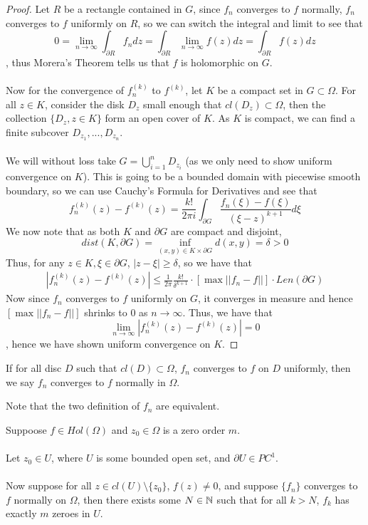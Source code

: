 \documentclass{article}
\begin{document}
\begin{proof}
Let $R$ be a rectangle contained in $G$, since $f_n$ converges to $f$ normally, $f_n$ converges to $f$ uniformly on $R$, so we can switch the integral and limit to see that
\[0 = \lim_{n \to \infty} \int_{\partial R} f_n dz = \int_{\partial R} \lim_{n \to \infty} f(z) dz = \int_{\partial R} f(z) dz\]
, thus Morera's Theorem tells us that $f$ is holomorphic on $G$.\\\\
Now for the convergence of $f_n^{(k)}$ to $f^{(k)}$, let $K$ be a compact set in $G \subset \Omega$. For all $z \in K$, consider the disk $D_z$ small enough that $cl(D_z) \subset \Omega$, then the collection $\{D_z, z\in K\}$ form an open cover of $K$. As $K$ is compact, we can find a finite subcover $D_{z_1}, ..., D_{z_n}$.\\\\
We will without loss take $G = \bigcup_{i = 1}^n D_{z_i}$ (as we only need to show uniform convergence on $K$). This is going to be a bounded domain with piecewise smooth boundary, so we can use Cauchy's Formula for Derivatives and see that
\[f^{(k)}_n(z) - f^{(k)}(z) = \frac{k!}{2\pi i} \int_{\partial G} \frac{f_n(\xi) - f(\xi)}{(\xi - z)^{k+1}} d\xi\]
We now note that as both $K$ and $\partial G$ are compact and disjoint,
\[dist(K, \partial G) = \inf_{(x, y) \in K \times \partial G} d(x, y) = \delta > 0\]
Thus, for any $z \in K, \xi \in \partial G$, $|z - \xi| \geq \delta$, so we have that
\begin{align*}
    |f^{(k)}_n(z) - f^{(k)}(z)| \leq \frac{1}{2\pi} \frac{k!}{\delta^{k+1}} \cdot [\max ||f_n  - f||] \cdot Len(\partial G)
\end{align*}
Now since $f_n$ converges to $f$ uniformly on $G$, it converges in measure and hence $[\max ||f_n  - f||]$ shrinks to $0$ as $n \to \infty$. Thus, we have that
\[\lim_{n \to \infty} |f^{(k)}_n(z) - f^{(k)}(z)| = 0\]
, hence we have shown uniform convergence on $K$.
\end{proof}

\begin{definition}
If for all disc $D$ such that $cl(D) \subset \Omega$, $f_n$ converges to $f$ on $D$ uniformly, then we say $f_n$ converges to $f$ normally in $\Omega$.    
\end{definition}

Note that the two definition of $f_n$ are equivalent.

\begin{theorem}
    Suppoose $f \in Hol(\Omega)$ and $z_0 \in \Omega$ is a zero order $m$.\\\\
    Let $z_0 \in U$, where $U$ is some bounded open set, and $\partial U \in PC^1$.\\\\
    Now suppose for all $z \in cl(U) \setminus \{z_0\}$, $f(z) \neq 0$, and suppose $\{f_n\}$ converges to $f$ normally on $\Omega$, then there exists some $N \in \mathbb{N}$ such that for all $k > N$, $f_k$ has exactly $m$ zeroes in $U$.
\end{theorem}
\end{document}

